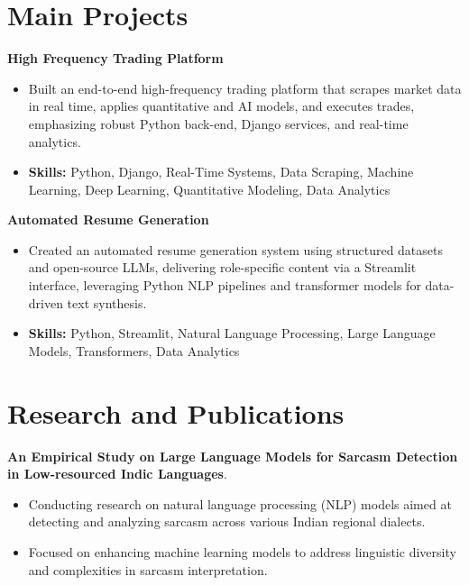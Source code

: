 \documentclass[a4paper,11pt]{article}
\begin{document}
\section{\textbf{Main Projects}}

\vspace{1mm}
  \textbf{High Frequency Trading Platform  }
\vspace{-1.5mm} %
\begin{itemize}
  \item Built an end-to-end high-frequency trading platform that scrapes market data in real time, applies quantitative and AI models, and executes trades, emphasizing robust Python back-end, Django services, and real-time analytics.
\vspace{-3mm}
  \item \textbf{Skills:} Python, Django, Real-Time Systems, Data Scraping, Machine Learning, Deep Learning, Quantitative Modeling, Data Analytics
\end{itemize}


\vspace{1mm}
   \textbf{Automated Resume Generation }
\vspace{-1.5mm} %
\begin{itemize}
  \item Created an automated resume generation system using structured datasets and open-source LLMs, delivering role-specific content via a Streamlit interface, leveraging Python NLP pipelines and transformer models for data-driven text synthesis.
\vspace{-3mm}
  \item \textbf{Skills:} Python, Streamlit, Natural Language Processing, Large Language Models, Transformers, Data Analytics
\end{itemize}



\section{\textbf{Research and Publications} \hfill }
\vspace{1mm}
  \textbf{An Empirical Study on Large Language Models for Sarcasm Detection in Low-resourced Indic Languages}.
\vspace{-1mm} %
\begin{itemize}
  \item Conducting research on natural language processing (NLP) models aimed at detecting and analyzing sarcasm across various Indian regional dialects.
\vspace{-3mm}
  \item Focused on enhancing machine learning models to address linguistic diversity and complexities in sarcasm interpretation.
\end{itemize}
\end{document}
